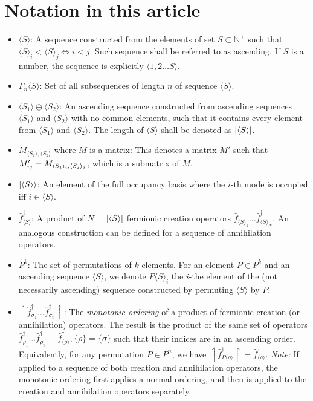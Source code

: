 \documentclass[12pt]{article}
\newcommand{\seq}[1]{\langle #1\rangle}
\newcommand{\asc}[1]{\upharpoonleft #1 \upharpoonright}
\newcommand{\hc}{^\dagger}
\begin{document}
	\section{Notation in this article}
	\begin{itemize}
		\item $\seq{S}$: A sequence constructed from the elements of set $S\subset \mathbb{N}^+$ such that\\ $\seq{S}_i< \seq{S}_j\iff i<j$. Such sequence shall be referred to as ascending. If $S$ is a number, the sequence is explicitly $\seq{1, 2\dots S}$.
		\item $\Gamma_n\seq{S}$: Set of all subsequences of length $n$ of sequence $\seq{S}$.
		\item $\seq{S_1}\oplus\seq{S_2}$: An ascending sequence constructed from ascending sequences $\seq{S_1}$ and $\seq{S_2}$ with no common elements, such that it contains every element from $\seq{S_1}$ and $\seq{S_2}$. The length of $\seq{S}$ shall be denoted as $\abs{\seq{S}}$.
		\item $M_{\seq{S_1},\seq{S_2}}$ where $M$ is a matrix: This denotes a matrix $M'$ such that $M'_{ij}=\nolinebreak M_{\seq{S_1}_i,\seq{S_2}_j}$, which is a submatrix of $M$.
		\item $\ket{\seq{S}}$: An element of the full occupancy basis where the $i$-th mode is occupied iff $i\in\seq{S}$.
		\item $\hat{f}\hc_{\seq{S}}$: A product of $N=\abs{\seq{S}}$ fermionic creation operators $\hat{f}\hc_{\seq{S}_1}\dots \hat{f}\hc_{\seq{S}_N}$. An analogous construction can be defined for a sequence of annihilation operators.
		\item $P^k$: The set of permutations of $k$ elements. For an element $P\in P^k$ and an ascending sequence $\seq{S}$, we denote $P\seq{S}_i$ the $i$-the element of the (not necessarily ascending) sequence constructed by permuting $\seq{S}$ by $P$.
		\item $\asc{\hat{f}\hc_{\sigma_1}\dots\hat{f}\hc_{\sigma_n}}$: The \textit{monotonic ordering} of a product of fermionic creation (or annihilation) operators. The result is the product of the same set of operators $\hat{f}\hc_{\rho_1}\dots\hat{f}\hc_{\rho_n}\equiv \hat{f}\hc_{\seq{\rho}}, \{\rho\}=\{\sigma\}$ such that their indices are in an ascending order. Equivalently, for any permutation $P\in P^n$, we have $\asc{\hat{f}\hc_{P\seq{\rho}}}=\hat{f}\hc_{\seq{\rho}}$. \textit{Note:} If applied to a sequence of both creation and annihilation operators, the monotonic ordering first applies a normal ordering, and then is applied to the creation and annihilation operators separately.
	\end{itemize}
	
\end{document}
